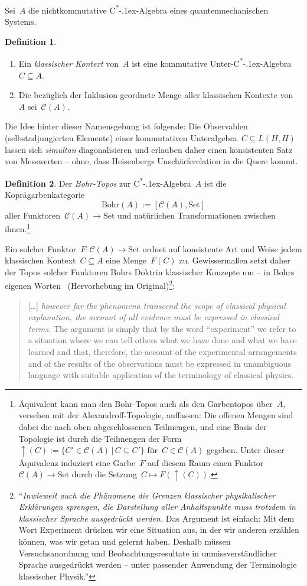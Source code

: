 \documentclass[a4paper,ngerman,12pt]{scrartcl}
\theoremstyle{definition}
\newtheorem{defn}{Definition}[section]
\theoremstyle{plain}
\theoremstyle{remark}
\newcommand{\C}{\mathcal{C}}
\newcommand{\Bohr}{\mathrm{Bohr}}
\newcommand{\csalgebra}{C\textsuperscript{*}\kern-.1ex-Algebra}
\newcommand{\Set}{\mathrm{Set}}
\renewcommand{\_}{\mathpunct{.}\,}
\newcommand{\?}{\,{:}\,}
\begin{document}
Sei~$A$ die nichtkommutative \csalgebra{} eines quantenmechanischen Systems.

\begin{defn}\begin{enumerate}
\item
Ein \emph{klassischer Kontext} von~$A$ ist eine kommutative Unter-\csalgebra~$C
\subseteq A$.
\item Die bezüglich der Inklusion geordnete Menge aller klassischen Kontexte
von~$A$ sei~$\C(A)$.
\end{enumerate}
\end{defn}

Die Idee hinter dieser Namensgebung ist folgende: Die Observablen
(selbstadjungierten Elemente) einer kommutativen Unteralgebra~$C \subseteq
L(H,H)$ lassen sich \emph{simultan} diagonalisieren und erlauben daher einen
konsistenten Satz von Messwerten -- ohne, dass Heisenbergs Unschärferelation in
die Quere kommt.

\begin{defn}Der \emph{Bohr-Topos} zur \csalgebra~$A$ ist die Koprägarbenkategorie
\[ \Bohr(A) := [\C(A), \Set] \]
aller Funktoren~$\C(A) \to \Set$ und natürlichen Transformationen zwischen
ihnen.\footnote{Äquivalent kann man den Bohr-Topos auch als den Garbentopos
über~$A$, versehen mit der Alexandroff-Topologie, auffassen: Die offenen Mengen
sind dabei die nach oben abgeschlossenen Teilmengen, und eine Basis der
Topologie ist durch die Teilmengen der Form~${\uparrow}(C) := \{ C' \in \C(A)
\,|\, C \subseteq C' \}$ für~$C \in \C(A)$ gegeben. Unter dieser Äquivalenz
induziert eine Garbe~$F$ auf diesem
Raum einen Funktor~$\C(A) \to \Set$ durch die Setzung~$C \mapsto
F({\uparrow}(C))$.}
\end{defn}

Ein solcher Funktor~$F : \C(A) \to \Set$ ordnet auf konsistente Art und Weise
jedem klassischen Kontext~$C \subseteq A$ eine Menge~$F(C)$ zu. Gewissermaßen
setzt daher der Topos solcher Funktoren Bohrs Doktrin klassischer Konzepte um
-- in Bohrs eigenen Worten~\cite[Seite~209]{bohr} (Hervorhebung im
Original)\footnote{"`\emph{Inwieweit auch
die Phänomene die Grenzen klassischer physikalischer
Erklärungen sprengen, die Darstellung aller Anhaltspunkte muss trotzdem
in klassischer Sprache ausgedrückt werden.} Das Argument ist einfach:
Mit dem Wort \glq Experiment\grq{} drücken wir eine Situation aus, in der wir
anderen erzählen können, was wir getan und gelernt haben. Deshalb müssen
Versuchsanordnung und Beobachtungsresultate in
unmissverständlicher Sprache ausgedrückt werden -- unter passender
Anwendung der Terminologie klassischer Physik."'}:
\begin{quote}
[\ldots] \emph{however far the phenomena transcend the scope of classical physical
explanation, the account of all evidence must be expressed in
classical terms.} The argument is simply that by the word ``experiment''
we refer to a situation where we can tell others what we
have done and what we have learned and that, therefore, the account of
the experimental arrangements and of the results of the observations
must be expressed in unambiguous language with suitable application of
the terminology of classical physics.
\end{quote}
\end{document}
